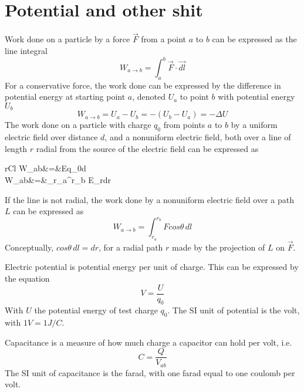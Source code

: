 \documentclass[nobib,notoc]{tufte-handout}
\begin{document}
\section{Potential and other shit}
\begin{rema}
	Work done on a particle by a force \(\vec{F}\) from a point \(a\) to \(b\) can be expressed as the line integral
	\begin{equation*}
		W_{a\rightarrow b}=\int_a^b\vec{F}\cdot\vec{dl}
	\end{equation*}
	For a conservative force, the work done can be expressed by the difference in potential energy at starting point \(a\), denoted \(U_a\) to point \(b\) with potential energy \(U_b\)
	\begin{equation*}
		W_{a\rightarrow b}=U_a-U_b=-(U_b-U_a)=-\Delta U
	\end{equation*}
	The work done on a particle with charge \(q_0\) from points \(a\) to \(b\) by a uniform electric field over distance \(d\), and a nonuniform electric field, both over a line of length \(r\) radial from the source of the electric field can be expressed as
	\begin{IEEEeqnarray*}{rCl}
		W_{a\rightarrow b}&=&Eq_0d\\
		W_{a\rightarrow b}&=&\int_{r_a}^{r_b} E_rdr
	\end{IEEEeqnarray*}
	If the line is not radial, the work done by a nonuniform electric field over a path \(L\) can be expressed as
	\begin{equation*}
		W_{a\rightarrow b}=\int_{r_a}^{r_b} F cos\theta\,dl
	\end{equation*}
	Conceptually, \(cos\theta\,dl=dr\), for a radial path \(r\) made by the projection of \(L\) on \(\vec{F}\).
\end{rema}
\begin{defi}
	Electric potential is potential energy per unit of charge. This can be expressed by the equation
	\begin{equation*}
		V=\frac{U}{q_0}
	\end{equation*}
	With \(U\) the potential energy of test charge \(q_0\). The SI unit of potential is the volt, with \(1V=1J/C\).
\end{defi}
\begin{defi}[Capacitance]
	Capacitance is a measure of how much charge a capacitor can hold per volt, i.e.
	\begin{equation*}
		C=\frac{Q}{V_{ab}}
	\end{equation*}
	The SI unit of capacitance is the farad, with one farad equal to one coulomb per volt.
\end{defi}
\end{document}
